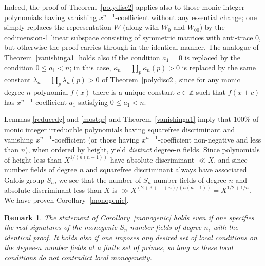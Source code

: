 \documentclass[11pt]{article}
\def\Z{{\mathbb Z}}
\def\Z{{\mathbb Z}}
\newtheorem{remark}[theorem]{Remark}
\begin{document}
Indeed, the proof of Theorem~\ref{polydisc2} applies also to those
monic integer polynomials having vanishing $x^{n-1}$-coefficient %
without any essential change; one simply replaces the representation
$W$ (along with $W_0$ and $W_{00}$) by the codimension-1 linear
subspace consisting of symmetric matrices with anti-trace $0$, but
otherwise the proof carries through in the identical manner.  The
analogue of Theorem~\ref{vanishinga1} holds also if the condition
$a_1=0$ is replaced by the condition $0\leq a_1<n$; in this case,
$\kappa_n=\prod_p\kappa_n(p)>0$ is replaced by the same constant
$\lambda_n=\prod_p\lambda_n(p)>0$ of Theorem~\ref{polydisc2}, since
for any monic degree-$n$ polynomial $f(x)$ there is a unique constant
$c\in\Z$ such that $f(x+c)$ has $x^{n-1}$-coefficient $a_1$ satisfying
$0\leq a_1<n$.


Lemmas \ref{reducedg} and \ref{mostqr} and Theorem~\ref{vanishinga1}
imply that 100\% of monic integer irreducible polynomials having
squarefree discriminant and vanishing $x^{n-1}$-coefficient (or those
having $x^{n-1}$-coefficient non-negative and less than $n$), when
ordered by height, yield {\it distinct} degree-$n$ fields.  Since
polynomials of height less than $X^{1/(n(n-1))}$ have absolute
discriminant $\ll X$, and since number fields of degree $n$ and
squarefree discriminant always have associated Galois group $S_n$, we
see that the number of $S_n$-number fields of degree $n$ and absolute
discriminant less than $X$ is $\gg
X^{(2+3+\cdots+n)/(n(n-1))}=X^{1/2+1/n}$. We have proven
Corollary~\ref{monogenic}.

\begin{remark}{\em
The statement of Corollary~\ref{monogenic} holds even if one specifies
the real signatures of the monogenic $S_n$-number fields of degree
$n$, with the identical proof.  It holds also if one imposes any
desired set of local conditions on the degree-$n$ number fields at a
finite set of primes, so long as these local conditions do not
contradict local monogeneity.  }\end{remark}
\end{document}

